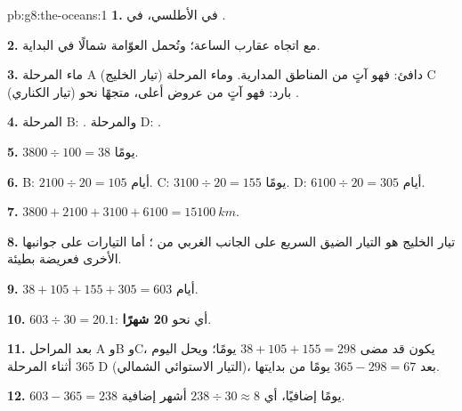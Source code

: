 \begin{solution}{pb:g8:the-oceans:1}
\textbf{1.} في  الأطلسي، في .

\textbf{2.} مع اتجاه عقارب الساعة؛ وتُحمل العوّامة شمالًا في البداية.

\textbf{3.} ماء المرحلة A (تيار الخليج) دافئ: فهو آتٍ من المناطق المدارية.
وماء المرحلة C (تيار الكناري) بارد: فهو آتٍ من عروض أعلى، متجهًا نحو .

\textbf{4.} المرحلة B: . والمرحلة D: .

\textbf{5.} $3800 \div 100 = 38$ يومًا.

\textbf{6.} B: $2100 \div 20 = 105$ أيام. C: $3100 \div 20 = 155$ يومًا.
D: $6100 \div 20 = 305$ أيام.

\textbf{7.} $3800 + 2100 + 3100 + 6100 = \qty{15100}{km}$.

\textbf{8.} تيار الخليج هو التيار الضيق السريع على الجانب الغربي من ؛
أما التيارات على جوانبها الأخرى فعريضة بطيئة.

\textbf{9.} $38 + 105 + 155 + 305 = 603$ أيام.

\textbf{10.} $603 \div 30 = 20.1$: أي نحو \textbf{20 شهرًا}.

\textbf{11.} بعد المراحل A وB وC، يكون قد مضى $38 + 105 + 155 = 298$ يومًا؛
ويحل اليوم 365 أثناء المرحلة D (التيار الاستوائي الشمالي)، بعد $365 -
298 = 67$ يومًا من بدايتها.

\textbf{12.} $603 - 365 = 238$ يومًا إضافيًا، أي $238 \div 30 \approx 8$
أشهر إضافية.
\end{solution}
